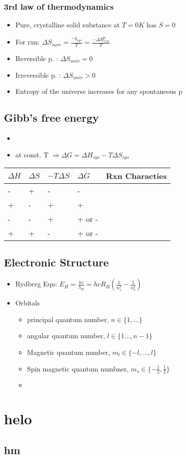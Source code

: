 \documentclass[ wastespaceontitle, english]{cheat_sheet_template}
\begin{document}
        \subsubsection{3rd law of thermodynamics}
            \begin{itemize}
                \item Pure, crystalline solid substance at $T=0K$ has $S=0$
                \item For rxn: $\Delta S_{surr} = \frac{-q_{sys}}{T} = \frac{- \Delta H_{rxn}^0}{T}$
                \item Reversible p. : $\Delta S_{univ} =0$
                \item Irreversible p. : $\Delta S_{univ} > 0$
                \item Entropy of the universe increases for any spontaneous p
            \end{itemize}
    \subsection{Gibb's free energy}
        \begin{itemize}
            \item {}
            \item at const. T $ \Rightarrow \Delta G= \Delta H_{sys} - T \Delta S_{sys}$
        \end{itemize}
        \begin{tabular*}{\linewidth}{l l l l l}
            $\Delta H$ & $\Delta S$ & $- T \Delta S$ & $\Delta G$ & Rxn Characties \\
            \hline
            - & + & - & - & \\
            + & - & + & + & \\
            - & - & + & + or - & \\
            + & + & - & + or - & 
        \end{tabular*}
    \subsection{Electronic Structure}
        \begin{itemize}
            \item Rydberg Equ: $ E_H = \frac{h c}{\lambda_H} = h c R_H (\frac{1}{n_1^2} - \frac{1}{n_2^2})$
            \item Orbitals 
            \begin{itemize}
                \item principal quantum number, $n \in \{1, ...\}$
                \item angular quantum number, $l \in \{1 ... , n-1\}$
                \item Magnetic quantum number, $m_l \in \{ -l, ... ,l\}$
                \item Spin magnetic quantum numbner, $m_s \in \{-\frac{1}{2}, \frac{1}{2}\}$
                \item 
            \end{itemize}
        \end{itemize}

\lipsum
\section{helo}
\subsection{hm}
\lipsum
\end{document}
